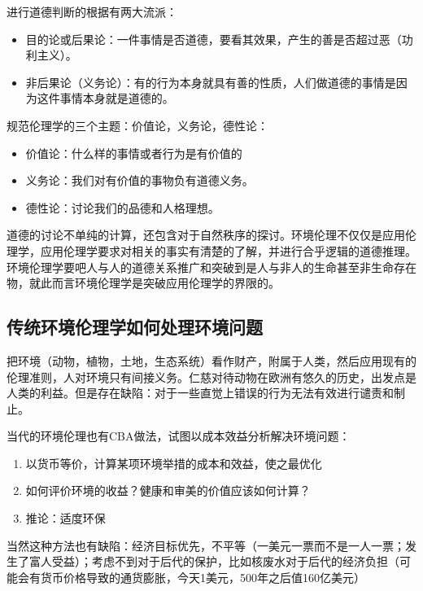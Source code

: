 \documentclass{ctexart}
\begin{document}
进行道德判断的根据有两大流派：

\begin{itemize}
    \item 目的论或后果论：一件事情是否道德，要看其效果，产生的善是否超过恶（功利主义）。
    \item 非后果论（义务论）：有的行为本身就具有善的性质，人们做道德的事情是因为这件事情本身就是道德的。
\end{itemize}

规范伦理学的三个主题：价值论，义务论，德性论：

\begin{itemize}
    \item 价值论：什么样的事情或者行为是有价值的
    \item 义务论：我们对有价值的事物负有道德义务。
    \item 德性论：讨论我们的品德和人格理想。
\end{itemize}

道德的讨论不单纯的计算，还包含对于自然秩序的探讨。环境伦理不仅仅是应用伦理学，应用伦理学要求对相关的事实有清楚的了解，并进行合乎逻辑的道德推理。环境伦理学要吧人与人的道德关系推广和突破到是人与非人的生命甚至非生命存在物，就此而言环境伦理学是突破应用伦理学的界限的。

\subsection{传统环境伦理学如何处理环境问题}

把环境（动物，植物，土地，生态系统）看作财产，附属于人类，然后应用现有的伦理准则，人对环境只有间接义务。仁慈对待动物在欧洲有悠久的历史，出发点是人类的利益。但是存在缺陷：对于一些直觉上错误的行为无法有效进行谴责和制止。

当代的环境伦理也有CBA做法，试图以成本效益分析解决环境问题：

\begin{enumerate}
    \item 以货币等价，计算某项环境举措的成本和效益，使之最优化
    \item 如何评价环境的收益？健康和审美的价值应该如何计算？
    \item 推论：适度环保
\end{enumerate}

当然这种方法也有缺陷：经济目标优先，不平等（一美元一票而不是一人一票；发生了富人受益）；考虑不到对于后代的保护，比如核废水对于后代的经济负担（可能会有货币价格导致的通货膨胀，今天1美元，500年之后值160亿美元）

\end{document}

